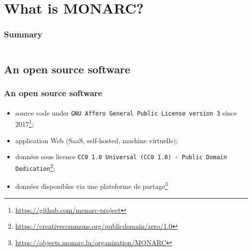 \documentclass[]{beamer}
\begin{document}
% 
%
\section{What is MONARC?}
\begin{frame}
    \frametitle{Summary}
    \begin{columns}[t]
        \begin{column}{5cm}
            \tableofcontents[sections={1-3}, currentsection, hideothersubsections]
        \end{column}
        \begin{column}{5cm}
            \tableofcontents[sections={4-5}, currentsection, hideothersubsections]
        \end{column}
    \end{columns}
\end{frame}
\subsection{An open source software}
\begin{frame}
\frametitle{An open source software}
\framesubtitle{}
    \begin{itemize}
        \item source code under \texttt{GNU Affero General Public License version 3} since 2017\footnote{\url{https://github.com/monarc-project}};
        \item application Web (SaaS, self-hosted, machine virtuelle);
        \item données sous licence \texttt{CC0 1.0 Universal (CC0 1.0) - Public Domain Dedication}\footnote{\url{https://creativecommons.org/publicdomain/zero/1.0}};
        \item données disponibles via une plateforme de partage\footnote{\url{https://objects.monarc.lu/organization/MONARC}}
    \end{itemize}
\end{frame}
\end{document}
